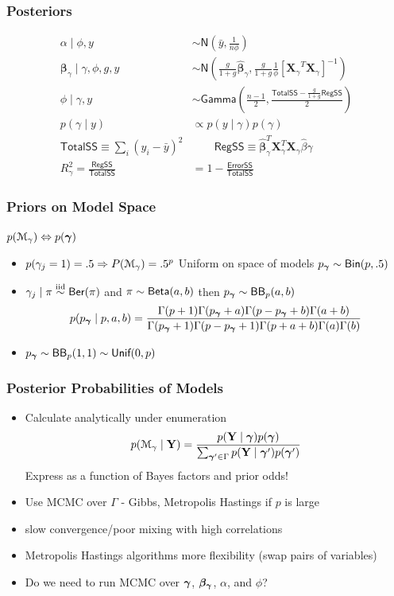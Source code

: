 \documentclass[]{beamer}
\begin{document}
\begin{frame}\frametitle{Posteriors}
\begin{align*}\alpha \mid \phi, y & \sim \textsf{N}\left(\bar{y}, \frac{1}{n \phi}\right)\\
\boldsymbol{\beta}_{\gamma} \mid \gamma, \phi, g, y &\sim \textsf{N}\left( \frac{g}{1 + g} \hat{\boldsymbol{\beta}}_{\gamma}, \frac{g}{1 + g} \frac{1}{\phi} \left[{\boldsymbol{X}_{\gamma}}^T \boldsymbol{X}_{\gamma} \right]^{-1}  \right) \\
\phi \mid \gamma, y & \sim \textsf{Gamma}\left(\frac{n-1}{2}, \frac{\textsf{TotalSS} - \frac{g}{1+g} \textsf{RegSS}}{2}\right) \\
p(\gamma \mid y) & \propto p(y \mid \gamma) p(\gamma) \\
\textsf{TotalSS} \equiv \sum_i (y_i - \bar{y})^2 & \qquad
\textsf{RegSS} \equiv \hat{\boldsymbol{\beta}}_\gamma^T \boldsymbol{X}_\gamma^T \boldsymbol{X}_\gamma \hat{\beta}\gamma\\
R^2_\gamma = \frac{\textsf{RegSS}}{\textsf{TotalSS}} & = 1 - \frac{\textsf{ErrorSS}}{\textsf{TotalSS}}
\end{align*}
\end{frame}
\begin{frame}
  \frametitle{Priors on Model Space}
  $p({\cal M}_\gamma) \Leftrightarrow p(\boldsymbol{\gamma})$
  \begin{itemize}
  \item $p(\gamma_j = 1) = .5 \Rightarrow P({\cal M}_\gamma) = .5^p$  Uniform on space of models \pause $p_{\boldsymbol{\gamma}} \sim \textsf{Bin}(p, .5)$
\item $\gamma_j \mid \pi \mathrel{\mathop{\sim}\limits^{\rm iid}} \textsf{Ber}(\pi)$ and $\pi \sim \textsf{Beta}(a,b)$ then  $p_{\boldsymbol{\gamma}} \sim \textsf{BB}_p(a, b)$
$$
p(p_{\boldsymbol{\gamma}} \mid p, a, b) = \frac{ \Gamma(p + 1) \Gamma(p_{\boldsymbol{\gamma}} + a) \Gamma(p - p_{\boldsymbol{\gamma}} + b) \Gamma (a + b) }{\Gamma(p_{\boldsymbol{\gamma}}+1) \Gamma(p - p_{\boldsymbol{\gamma}} + 1) \Gamma(p + a + b) \Gamma(a) \Gamma(b)}
$$
\item $p_{\boldsymbol{\gamma}} \sim \textsf{BB}_p(1, 1) \sim \textsf{Unif}(0, p)$
  \end{itemize}
\end{frame}


\begin{frame} \frametitle{Posterior Probabilities of Models}

\begin{itemize}
  \item  Calculate analytically under enumeration
  $$p({\cal M}_\gamma \mid \mathbf{Y} )= \frac{p(\mathbf{Y} \mid \boldsymbol{\gamma}) p(\boldsymbol{\gamma})} {\sum_{\boldsymbol{\gamma}^\prime \in \Gamma} p(\mathbf{Y} \mid \boldsymbol{\gamma}^\prime) p(\boldsymbol{\gamma}^\prime)}$$
  Express as a function of Bayes factors and prior odds!
  
  \item Use MCMC over $\Gamma$ - Gibbs, Metropolis Hastings if $p$ is large
  
 \item slow convergence/poor mixing with high correlations \pause
  \item Metropolis Hastings algorithms more flexibility \pause
        (swap pairs of variables)

  
  \item Do we need to run MCMC over $\boldsymbol{\gamma}$, $\boldsymbol{\beta_\gamma}$, $\alpha$, and $\phi$?
\end{itemize}

\end{frame}
\end{document}
